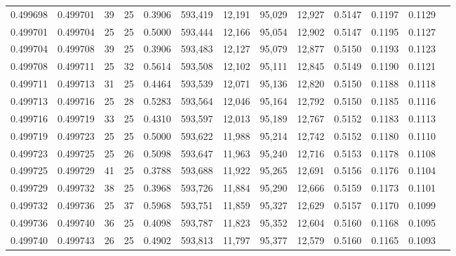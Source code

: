 \begin{tabular}{rrrrrrrrrrrrr}
0.499698 & 0.499701 &    39 &  25 &                                     0.3906 & 593,419 &  12,191 &  95,029 &  12,927 & 0.5147 & 0.1197 & 0.1129 \\
0.499701 & 0.499704 &    25 &  25 &                                     0.5000 & 593,444 &  12,166 &  95,054 &  12,902 & 0.5147 & 0.1195 & 0.1127 \\
0.499704 & 0.499708 &    39 &  25 &                                     0.3906 & 593,483 &  12,127 &  95,079 &  12,877 & 0.5150 & 0.1193 & 0.1123 \\
0.499708 & 0.499711 &    25 &  32 &                                     0.5614 & 593,508 &  12,102 &  95,111 &  12,845 & 0.5149 & 0.1190 & 0.1121 \\
0.499711 & 0.499713 &    31 &  25 &                                     0.4464 & 593,539 &  12,071 &  95,136 &  12,820 & 0.5150 & 0.1188 & 0.1118 \\
0.499713 & 0.499716 &    25 &  28 &                                     0.5283 & 593,564 &  12,046 &  95,164 &  12,792 & 0.5150 & 0.1185 & 0.1116 \\
0.499716 & 0.499719 &    33 &  25 &                                     0.4310 & 593,597 &  12,013 &  95,189 &  12,767 & 0.5152 & 0.1183 & 0.1113 \\
0.499719 & 0.499723 &    25 &  25 &                                     0.5000 & 593,622 &  11,988 &  95,214 &  12,742 & 0.5152 & 0.1180 & 0.1110 \\
0.499723 & 0.499725 &    25 &  26 &                                     0.5098 & 593,647 &  11,963 &  95,240 &  12,716 & 0.5153 & 0.1178 & 0.1108 \\
0.499725 & 0.499729 &    41 &  25 &                                     0.3788 & 593,688 &  11,922 &  95,265 &  12,691 & 0.5156 & 0.1176 & 0.1104 \\
0.499729 & 0.499732 &    38 &  25 &                                     0.3968 & 593,726 &  11,884 &  95,290 &  12,666 & 0.5159 & 0.1173 & 0.1101 \\
0.499732 & 0.499736 &    25 &  37 &                                     0.5968 & 593,751 &  11,859 &  95,327 &  12,629 & 0.5157 & 0.1170 & 0.1099 \\
0.499736 & 0.499740 &    36 &  25 &                                     0.4098 & 593,787 &  11,823 &  95,352 &  12,604 & 0.5160 & 0.1168 & 0.1095 \\
0.499740 & 0.499743 &    26 &  25 &                                     0.4902 & 593,813 &  11,797 &  95,377 &  12,579 & 0.5160 & 0.1165 & 0.1093 \\

\end{tabular}
